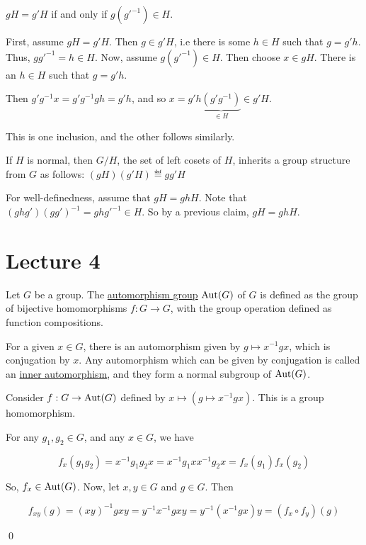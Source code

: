 \documentclass[x11names,reqno,14pt]{extarticle}
\begin{document}
$gH = g'H$ if and only if $g(g'^{-1}) \in H$. 

\proof

First, assume $gH = g'H$. Then $g \in g'H$, i.e there is some $h \in H$ such that $g = g'h$. Thus, $gg'^{-1} = h \in H$. Now, assume $g(g'^{-1}) \in H$. Then choose $x \in gH$. There is an $h \in H$ such that $g = g'h$. 

Then $g'g^{-1}x = g'g^{-1}gh = g'h$, and so $x = g'h\underbrace{(g'g^{-1})}_{\in H}\in g'H$.

This is one inclusion, and the other follows similarly. 

\claim If $H$ is normal, then $G/H$, the set of left cosets of $H$, inherits a group structure from $G$ as follows: $(gH)(g'H) \eqdef gg'H$

\proof

For well-definedness, assume that $gH = ghH$. Note that $(ghg')(gg')^{-1} = ghg'^{-1} \in H$. So by a previous claim, $gH = ghH$.



\section*{Lecture 4}



Let $G$ be a group. The \underline{automorphism group} ${\mathrm{Aut}}(G)$ of $G$ is defined as the group of bijective homomorphisms $f:G\to G$, with the group operation defined as function compositions. 

For a given $x \in G$, there is an automorphism given by $g \mapsto x^{-1}gx$, which is conjugation by $x$. Any automorphism which can be given by conjugation is called an \underline{inner automorphism}, and they form a normal subgroup of ${\mathrm{Aut}}(G)$. 

\claim Consider $f:G\to{\mathrm{Aut}}(G)$ defined by $x \mapsto (g \mapsto x^{-1}gx)$. This is a group homomorphism. 

\proof

For any $g_1, g_2 \in G$, and any $x \in G$, we have

\[
f_x(g_1g_2) = x^{-1}g_1g_2x = x^{-1}g_1xx^{-1}g_2x =f_x(g_1)f_x(g_2)
\]

So, $f_x \in {\mathrm{Aut}}(G)$. Now, let $x, y \in G$ and $g \in G$. Then

\[
f_{xy}(g) = (xy)^{-1}gxy = y^{-1}x^{-1}gxy = y^{-1}(x^{-1}gx)y = (f_x \circ f_y) (g)
\]

\qed

\end{document}
